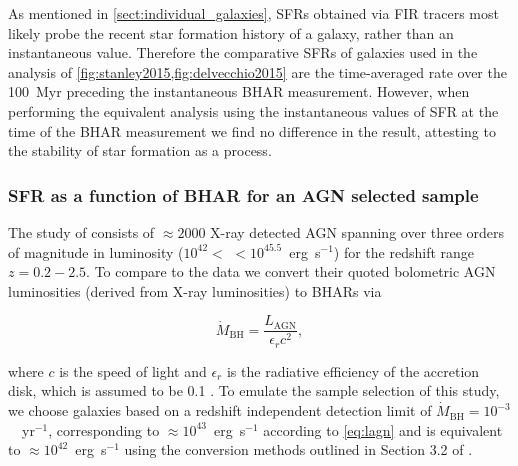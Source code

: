 As mentioned in \cref{sect:individual_galaxies}, SFRs obtained via FIR tracers
most likely probe the recent star formation history of a galaxy, rather than an
instantaneous value. Therefore the comparative SFRs of \eagle galaxies used
in the analysis of \cref{fig:stanley2015,fig:delvecchio2015} are the
time-averaged rate over the 100~Myr preceding the instantaneous BHAR
measurement. However, when performing the equivalent analysis using the
instantaneous values of SFR at the time of the BHAR measurement we find no
difference in the result, attesting to the stability of star formation as a
process.   

\subsubsection{SFR as a function of BHAR for an AGN selected sample}

The study of \citet{Stanley2015} consists of $\approx 2000$ X-ray detected AGN
spanning over three orders of magnitude in luminosity ($10^{42} < $ \LXray$<
10^{45.5}$~erg~s$^{-1}$) for the redshift range $z=0.2 - 2.5$. To compare to
the data we convert their quoted bolometric AGN luminosities (derived from
X-ray luminosities) to BHARs via  

\begin{equation} 
\dot M_{\mathrm{BH}} = \frac{L_{\mathrm{AGN}}}{\epsilon_{r} c^{2}},
\label{eq:lagn}
\end{equation}

\noindent where $c$ is the speed of light and $\epsilon_{r}$ is the radiative
efficiency of the accretion disk, which is assumed to be 0.1
\citep{Shakura1973}. To emulate the sample selection of this study, we choose
\eagle galaxies based on a redshift independent detection limit of $\dot
M_{\mathrm{BH}} = 10^{-3}$~\Msol~yr$^{-1}$, corresponding to \LAGN$\approx
10^{43}$~erg~s$^{-1}$ according to \cref{eq:lagn} and is equivalent to \LXray
$\approx 10^{42}$~erg~s$^{-1}$ using the conversion methods outlined in Section
3.2 of \citet{Stanley2015}.

